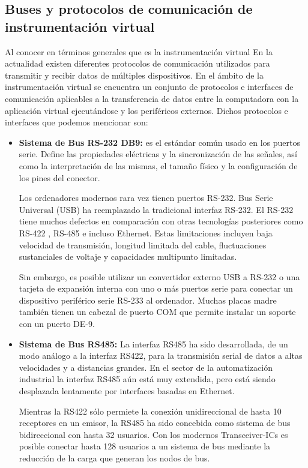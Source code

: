 \documentclass[12pt,letterpaper, onecolumn, titlepage, oneside]{book}
\begin{document}
\subsection{Buses y protocolos de comunicación de instrumentación virtual}

Al conocer en términos generales que es la instrumentación virtual
En la actualidad existen diferentes protocolos de comunicación utilizados para transmitir y recibir datos de múltiples dispositivos. En el ámbito de la instrumentación virtual se encuentra un conjunto de protocolos e interfaces de comunicación aplicables a la transferencia de datos entre la computadora con la aplicación virtual ejecutándose y los periféricos externos. Dichos protocolos e interfaces que podemos mencionar son:

\begin{itemize}
    \item \textbf{Sistema de Bus RS-232 DB9:} es el estándar común usado en los puertos serie. Define las propiedades eléctricas y la sincronización de las señales, así como la interpretación de las mismas, el tamaño físico y la configuración de los pines del conector. 
    
    Los ordenadores modernos rara vez tienen puertos RS-232. Bus Serie Universal (USB) ha reemplazado la tradicional interfaz RS-232. El RS-232 tiene muchos defectos en comparación con otras tecnologías posteriores como RS-422 , RS-485 e incluso Ethernet. Estas limitaciones incluyen baja velocidad de transmisión, longitud limitada del cable, fluctuaciones sustanciales de voltaje y capacidades multipunto limitadas.
    
    Sin embargo, es posible utilizar un convertidor externo USB a RS-232 o una tarjeta de expansión interna con uno o más puertos serie para conectar un dispositivo periférico serie RS-233 al ordenador. Muchas placas madre también tienen un cabezal de puerto COM que permite instalar un soporte con un puerto DE-9.

    \item \textbf{Sistema de Bus RS485:} La interfaz RS485 ha sido desarrollada, de un modo análogo a la interfaz RS422, para la transmisión serial de datos a altas velocidades y a distancias grandes. En el sector de la automatización industrial la interfaz RS485 aún está muy extendida, pero está siendo desplazada lentamente por interfaces basadas en Ethernet.
    
    Mientras la RS422 sólo permiete la conexión unidireccional de hasta 10 receptores en un emisor, la RS485 ha sido concebida como sistema de bus bidireccional con hasta 32 usuarios. Con los modernos Transceiver-ICs es posible conectar hasta 128 usuarios a un sistema de bus mediante la reducción de la carga que generan los nodos de bus.
    

\end{itemize}
\end{document}
